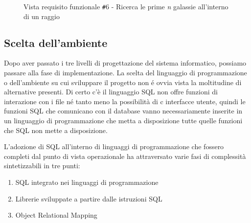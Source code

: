 \documentclass[12pt,a4paper,onecolumn,x11names]{article}
\begin{document}
\begin{figure}[h!]
		\caption{Vista requisito funzionale \texttt{\#}6 - Ricerca le prime \textit{n} galassie all'interno di un raggio}
	\end{figure}

\clearpage
	\subsection{Scelta dell'ambiente}
	\begin{flushleft}
		Dopo aver passato i tre livelli di progettazione del sistema informatico, possiamo passare alla fase di implementazione. La scelta del linguaggio di programmazione o dell'ambiente su cui sviluppare il progetto non \'{e} ovvia vista la moltitudine di alternative presenti. \newline
		Di certo c'è il linguaggio SQL non offre funzioni di interazione con i file n\'{e} tanto meno la possibilità di c interfacce utente, quindi le funzioni SQL che comunicano con il database vanno necessariamente inserite in un linguaggio di programmazione che metta a disposizione tutte quelle funzioni che SQL non mette a disposizione.\newline
		
		L'adozione di SQL all'interno di linguaggi di programmazione che fossero completi dal punto di vista operazionale ha attraversato varie fasi di complessità sintetizzabili in tre punti:
	\end{flushleft}
	\begin{enumerate}
		\item SQL integrato nei linguaggi di programmazione
		\item Librerie sviluppate a partire dalle istruzioni SQL
		\item Object Relational Mapping
	\end{enumerate}
\end{document}
